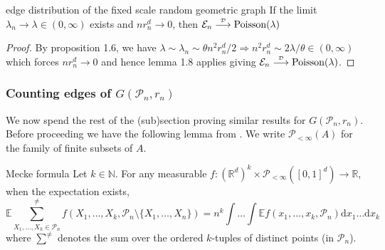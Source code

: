 \documentclass{article}
\newcommand\indist{\stackrel{\mathclap{\tiny\mbox{$\mathcal{D}$}}}{\longrightarrow}}
\begin{document}
\begin{corollary}[]{edge distribution of the fixed scale random geometric graph}
    If the limit $\lambda_n \to \lambda \in (0,\infty)$ exists and $nr_n^d \to 0$, then 
    $\mathcal{E}_n \indist \text{Poisson}(\lambda)$
\end{corollary}

\begin{proof}
    By proposition 1.6, we have $\lambda \sim \lambda_n \sim \theta n^2 r_n^d/2 \Rightarrow n^2 r_n^d \sim 2\lambda/\theta 
    \in (0, \infty)$ which forces $n r_n^d \to 0$ and hence lemma 1.8 applies giving $\mathcal{E}_n \indist \text{Poisson}(\lambda)$.
\end{proof}

\subsubsection*{Counting edges of $G(\mathcal{P}_n, r_n)$}

We now spend the rest of the (sub)section proving similar results for $G(\mathcal{P}_n, r_n)$. Before proceeding we have
the following lemma from \cite{Penrose_et_al_2016}. We write $\mathcal{P}_{< \infty}(A)$ for the family of finite subsets of $A$. 

\begin{lemma}[]{Mecke formula}
    Let $k \in \mathbb{N}$. For any measurable $f: (\mathbb{R}^d)^k \times \mathcal{P}_{< \infty}([0,1]^d) \to \mathbb{R}$, 
    when the expectation exists, 
    \[\mathbb{E}\sum_{X_1, \dots, X_k \in \mathcal{P}_n}^{\neq} f(X_1, \dots, X_k, \mathcal{P}_n \setminus \{X_1, \dots, X_n\})
    = n^k \int \dots \int \mathbb{E}f(x_1, \dots, x_k, \mathcal{P}_n)\mathrm{d}x_1 \dots \mathrm{d}x_k\]
    where $\sum^{\neq}$ denotes the sum over the ordered $k$-tuples of distinct points (in $\mathcal{P}_n$).
\end{lemma}
\end{document}
